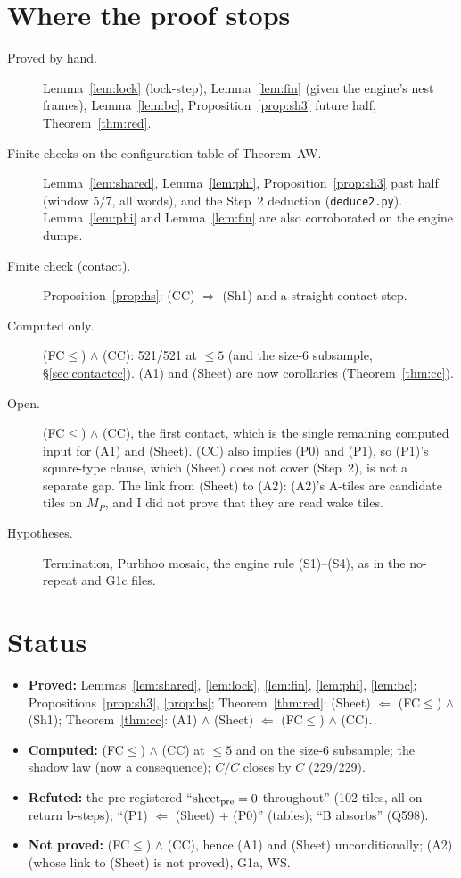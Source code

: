 \documentclass[11pt]{article}
\theoremstyle{definition}\newtheorem{definition}[theorem]{Definition}\newtheorem{remark}[theorem]{Remark}
\begin{document}
\section{Where the proof stops}\label{sec:gaps}
\begin{description}
\item[Proved by hand.] Lemma~\ref{lem:lock} (lock-step), Lemma~\ref{lem:fin} (given the engine's nest frames), Lemma~\ref{lem:bc}, Proposition~\ref{prop:sh3} future half, Theorem~\ref{thm:red}.
\item[Finite checks on the configuration table of Theorem~AW.] Lemma~\ref{lem:shared}, Lemma~\ref{lem:phi}, Proposition~\ref{prop:sh3} past half (window $5/7$, all words), and the Step~2 deduction (\texttt{deduce2.py}). Lemma~\ref{lem:phi} and Lemma~\ref{lem:fin} are also corroborated on the engine dumps.
\item[Finite check (contact).] Proposition~\ref{prop:hs}: (CC) $\Rightarrow$ (Sh1) and a straight contact step.
\item[Computed only.] (FC$\le$) $\wedge$ (CC): 521/521 at $\le5$ (and the size-6 subsample, \S\ref{sec:contactcc}). (A1) and (Sheet) are now corollaries (Theorem~\ref{thm:cc}).
\item[Open.] (FC$\le$) $\wedge$ (CC), the first contact, which is the single remaining computed input for (A1) and (Sheet). (CC) also implies (P0) and (P1), so (P1)'s square-type clause, which (Sheet) does not cover (Step~2), is not a separate gap. The link from (Sheet) to (A2): (A2)'s A-tiles are candidate tiles on $M_P$, and I did not prove that they are read wake tiles.
\item[Hypotheses.] Termination, Purbhoo mosaic, the engine rule (S1)--(S4), as in the no-repeat and G1c files.
\end{description}

\section*{Status}
\begin{itemize}
\item \textbf{Proved:} Lemmas~\ref{lem:shared}, \ref{lem:lock}, \ref{lem:fin}, \ref{lem:phi}, \ref{lem:bc}; Propositions~\ref{prop:sh3}, \ref{prop:hs}; Theorem~\ref{thm:red}: (Sheet) $\Leftarrow$ (FC$\le$) $\wedge$ (Sh1); Theorem~\ref{thm:cc}: (A1) $\wedge$ (Sheet) $\Leftarrow$ (FC$\le$) $\wedge$ (CC).
\item \textbf{Computed:} (FC$\le$) $\wedge$ (CC) at $\le5$ and on the size-6 subsample; the shadow law (now a consequence); $C/C$ closes by $C$ (229/229).
\item \textbf{Refuted:} the pre-registered ``$\mathrm{sheet}_{\rm pre}=0$ throughout'' (102 tiles, all on return b-steps); ``(P1) $\Leftarrow$ (Sheet) + (P0)'' (tables); ``B absorbs'' (Q598).
\item \textbf{Not proved:} (FC$\le$) $\wedge$ (CC), hence (A1) and (Sheet) unconditionally; (A2) (whose link to (Sheet) is not proved), G1a, WS.
\end{itemize}
\end{document}
